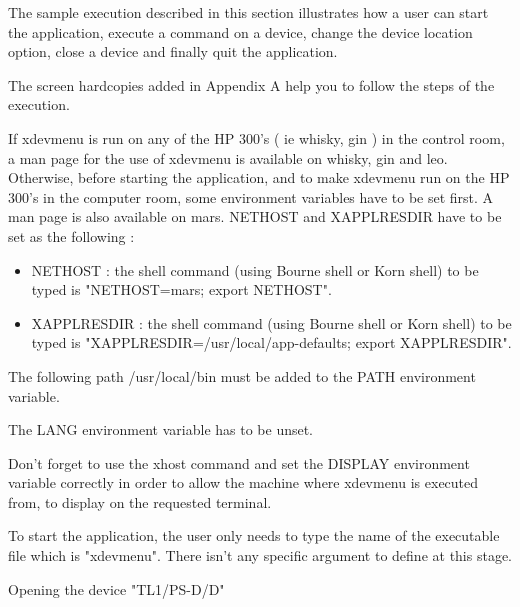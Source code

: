 %
%
%
%
%
%
%
%
%
%
The sample execution described in this section illustrates how a user can
start the application, execute a command on a device, change the device
location option, close a device and finally quit the application.

The screen hardcopies added in Appendix A help you to follow the steps of
the execution.

If xdevmenu is run on any of the HP 300's ( ie whisky, gin ) in the control 
room, a man page for the use of xdevmenu is available on whisky, gin and leo. 
Otherwise, 
before starting the application, and to make xdevmenu run on the HP 300's in the computer room, some environment variables have to be set first.
 A man page is also available on mars. 
NETHOST and XAPPLRESDIR have to be set as the following :
\begin{itemize}
\item
{ NETHOST : }the shell command (using Bourne shell or Korn shell) to be typed
is "NETHOST=mars; export NETHOST".
\item
{ XAPPLRESDIR : }the shell command (using Bourne shell or Korn shell) to be typed
is "XAPPLRESDIR=/usr/local/app-defaults; export XAPPLRESDIR".
\end{itemize}

The following path  /usr/local/bin  must be added to the
PATH environment variable.

The LANG environment variable has to be unset.

Don't forget to use the xhost command and set the DISPLAY environment variable 
correctly in order to allow the machine where xdevmenu is executed from, to display on the requested terminal.

To start the application, the user only needs to type the name of the executable
file which is "xdevmenu". There isn't any specific argument to define at
this stage.

	{Opening the device "TL1/PS-D/D"}

